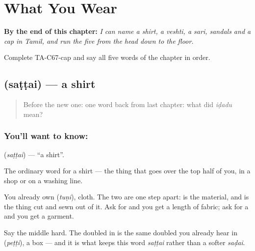 
\chapter{What You Wear}
\label{ch:ta-what-you-wear}

\begin{chapteropening}
\textbf{By the end of this chapter:} \emph{I can name a shirt, a veshti, a sari, sandals and a cap in Tamil, and run the five from the head down to the floor.}

Complete TA-C67-cap and say all five words of the chapter in order.
\end{chapteropening}

\section[\texorpdfstring{\ta{சட்டை} (saṭṭai)}{சட்டை (saṭṭai)}]{ (saṭṭai) — a shirt}

\label{lesson:TA-C67-shirt}



\begin{quote}
Before the new one: one word back from last chapter: what did \emph{iḍadu} mean?
\end{quote}

\subsection*{You'll want to know: }
\textbf{} (\emph{saṭṭai}) — \textquotedblleft{}a shirt\textquotedblright{}.

The ordinary word for a shirt — the thing that goes over the top half of you, in a shop or on a washing line.

You already own  (\emph{tuṇi}), cloth. The two are one step apart:  is the material, and  is the thing cut and sewn out of it. Ask for  and you get a length of fabric; ask for a  and you get a garment.

Say the middle hard. The doubled \textbf{} in  is the same doubled  you already hear in  (\emph{peṭṭi}), a box — and it is what keeps this word \emph{saṭṭai} rather than a softer \emph{saḍai}.

